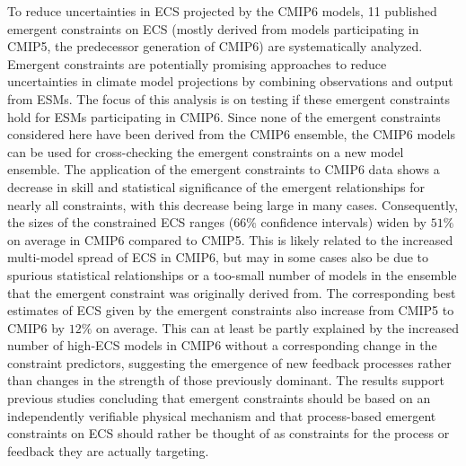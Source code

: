 To reduce uncertainties in \acs{ECS} projected by the \acs{CMIP}6 models, 11
published emergent constraints on \acs{ECS} (mostly derived from models
participating in \acs{CMIP}5, the predecessor generation of \acs{CMIP}6) are
systematically analyzed. Emergent constraints are potentially promising
approaches to reduce uncertainties in climate model projections by combining
observations and output from \acsp{ESM}. The focus of this analysis is on
testing if these emergent constraints hold for \acsp{ESM} participating in
\acs{CMIP}6. Since none of the emergent constraints considered here have been
derived from the \acs{CMIP}6 ensemble, the \acs{CMIP}6 models can be used for
cross-checking the emergent constraints on a new model ensemble. The
application of the emergent constraints to \acs{CMIP}6 data shows a decrease in
skill and statistical significance of the emergent relationships for nearly all
constraints, with this decrease being large in many cases. Consequently, the
sizes of the constrained \acs{ECS} ranges ($66 \unit{\%}$ confidence intervals)
widen by $51 \unit{\%}$ on average in \acs{CMIP}6 compared to \acs{CMIP}5. This
is likely related to the increased multi-model spread of \acs{ECS} in
\acs{CMIP}6, but may in some cases also be due to spurious statistical
relationships or a too-small number of models in the ensemble that the emergent
constraint was originally derived from. The corresponding best estimates of
\acs{ECS} given by the emergent constraints also increase from \acs{CMIP}5 to
\acs{CMIP}6 by $12 \unit{\%}$ on average. This can at least be partly explained
by the increased number of high-\acs{ECS} models in \acs{CMIP}6 without a
corresponding change in the constraint predictors, suggesting the emergence of
new feedback processes rather than changes in the strength of those previously
dominant. The results support previous studies concluding that emergent
constraints should be based on an independently verifiable physical mechanism
and that process-based emergent constraints on \acs{ECS} should rather be
thought of as constraints for the process or feedback they are actually
targeting.

